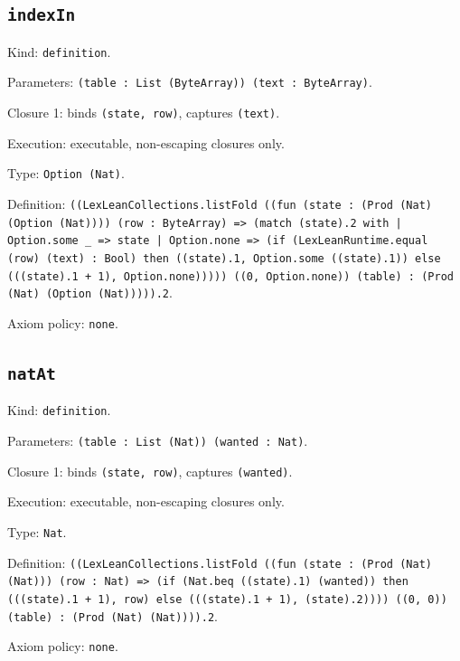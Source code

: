 \documentclass[11pt]{article}
\begin{document}
\subsection*{\texttt{indexIn}}
\noindent Kind: \texttt{definition}.\par
\noindent Parameters: \texttt{(table : List (ByteArray)) (text : ByteArray)}.\par
\noindent Closure 1: binds \texttt{(state, row)}, captures \texttt{(text)}.\par
\noindent Execution: executable, non-escaping closures only.\par
\noindent Type: \texttt{Option (Nat)}.\par
\noindent Definition: \texttt{((LexLeanCollections.listFold ((fun (state : (Prod (Nat) (Option (Nat)))) (row : ByteArray) => (match (state).2 with | Option.some \_ => state | Option.none => (if (LexLeanRuntime.equal (row) (text) : Bool) then ((state).1, Option.some ((state).1)) else (((state).1 + 1), Option.none))))) ((0, Option.none)) (table) : (Prod (Nat) (Option (Nat))))).2}.\par
\noindent Axiom policy: \texttt{none}.\par
\subsection*{\texttt{natAt}}
\noindent Kind: \texttt{definition}.\par
\noindent Parameters: \texttt{(table : List (Nat)) (wanted : Nat)}.\par
\noindent Closure 1: binds \texttt{(state, row)}, captures \texttt{(wanted)}.\par
\noindent Execution: executable, non-escaping closures only.\par
\noindent Type: \texttt{Nat}.\par
\noindent Definition: \texttt{((LexLeanCollections.listFold ((fun (state : (Prod (Nat) (Nat))) (row : Nat) => (if (Nat.beq ((state).1) (wanted)) then (((state).1 + 1), row) else (((state).1 + 1), (state).2)))) ((0, 0)) (table) : (Prod (Nat) (Nat)))).2}.\par
\noindent Axiom policy: \texttt{none}.\par
\end{document}
